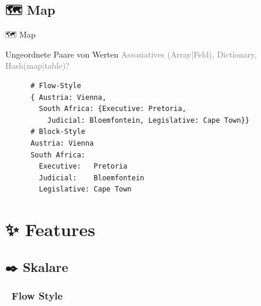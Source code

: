 \documentclass{beamer}
\begin{document}
\subsection{🗺 Map}

\begin{frame}[fragile]{🗺 Map}
  \begin{block}{Ungeordnete Paare von Werten}
    \textcolor{gray}{Assoziatives (Array|Feld), Dictionary, Hash(map|table)?}\\
    \begin{verbatim}
      # Flow-Style
      { Austria: Vienna,
        South Africa: {Executive: Pretoria,
          Judicial: Bloemfontein, Legislative: Cape Town}}
      # Block-Style
      Austria: Vienna
      South Africa:
        Executive:   Pretoria
        Judicial:    Bloemfontein
        Legislative: Cape Town
    \end{verbatim}
  \end{block}
\end{frame}

\section{✨ Features}
\subsection{✒️ Skalare}

\subsubsection{🌊 Flow Style}
\end{document}
